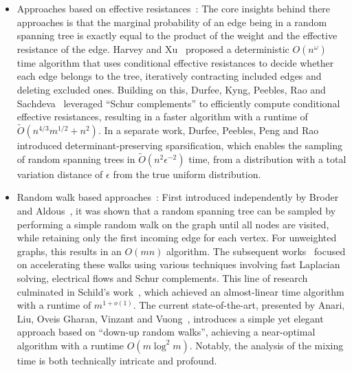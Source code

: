 \documentclass[11pt]{article}
\begin{document}
{\begin{itemize}
	\item Approaches based on effective resistances~\cite{harvey2016generating, durfee2017sampling, durfee2017determinant}: 
	The core insights behind there approaches is that the marginal probability of an edge being in a random spanning tree is exactly equal to the product of the weight and the effective resistance of the edge. Harvey and Xu~\cite{harvey2016generating} proposed a deterministic $O(n^\omega)$ time algorithm that uses conditional effective resistances to decide whether each edge belongs to the tree, iteratively contracting included edges and deleting excluded ones. Building on this, Durfee, Kyng, Peebles, Rao and Sachdeva~\cite{durfee2017sampling} leveraged ``Schur complements'' to  efficiently compute conditional effective resistances, resulting in a faster algorithm with a runtime of  $\widetilde O(n ^{4/3}m^{1/2}+n ^2)$.  In a separate work, Durfee, Peebles, Peng and Rao~\cite{durfee2017determinant} introduced determinant-preserving sparsification, which enables the sampling of random spanning trees in $\widetilde{O}(n^2 \epsilon^{-2})$ time, from a distribution with a total variation distance of $\epsilon$ from the true uniform distribution.	


	\item Random walk based approaches~\cite{broder1989generating, aldous1990random, wilson1996generating, kelner2009faster, madry2014fast, schild2018almost, anari2021log}: First introduced independently by Broder~\cite{broder1989generating} and Aldous~\cite{aldous1990random}, it was shown that  a random spanning tree can be sampled by performing a simple random walk on the graph until all nodes are visited, while retaining only the first incoming edge for each vertex. For unweighted graphs, this results in an $O(mn)$ algorithm. The subsequent works~\cite{wilson1996generating, kelner2009faster, madry2014fast} focused on accelerating these walks using various techniques involving fast Laplacian solving, electrical flows and Schur complements. This line of research culminated in Schild's work~\cite{schild2018almost}, which achieved an almost-linear time algorithm with a runtime of $m^{1+o(1)}$. The current state-of-the-art, presented by Anari, Liu, Oveis Gharan, Vinzant and Vuong~\cite{anari2021log}, introduces a simple yet elegant approach based on ``down-up random walks'', achieving a near-optimal algorithm with a runtime $O(m \log^2 m)$. Notably, the analysis of the mixing time is both technically intricate and profound.
\end{itemize}

}
\end{document}
